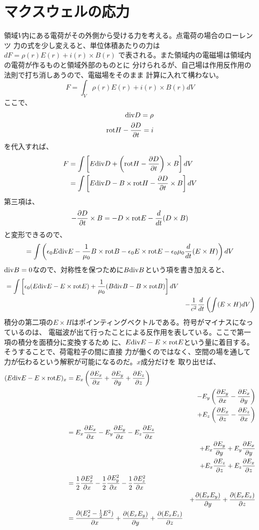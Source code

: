    \section{マクスウェルの応力}
        領域$V$内にある電荷がその外側から受ける力を考える。点電荷の場合のローレンツ
        力の式を少し変えると、単位体積あたりの力は$dF = \rho(r)E(r)+i(r)\times B(r)$
        で表される。また領域内の電磁場は領域内の電荷が作るものと領域外部のものとに
        分けられるが、自己場は作用反作用の法則で打ち消しあうので、電磁場をそのまま
        計算に入れて構わない。
            \[F = \int_V \rho(r)E(r) + i(r)\times B(r)dV\]
        ここで、
        \begin{align*}
            \dive D = \rho\\
            \rot H - \pd[D]{t} = i
        \end{align*}
        を代入すれば、
        \begin{align*}
            F &= \int \llr{E\dive D + \lr{\rot H - \pd[D]{t}}\times B}dV\\
            &= \int \llr{E\dive D - B\times\rot H - \pd[D]{t}\times B}dV
        \end{align*}
        第三項は、
            \[-\pd[D]{t}\times B = -D\times\rot E - \de{t}(D\times B)\]
        と変形できるので、
            \[= \int\lr{\epsilon_0E\dive E - \rec{\mu_0}B\times\rot B
            - \epsilon_0E\times\rot E - \epsilon_0\mu_0\de{t}(E\times H)}dV\]
        $\dive B = 0$なので、対称性を保つために$B\dive B$という項を書き加えると、
        \begin{align*}
            &= \int \llr{\epsilon_0(E\dive E-E\times\rot E)
            + \rec{\mu_0}(B\dive B - B\times\rot B)}dV\\
            & &- \rec{c^2}\de{t}\lr{\int (E\times H)dV}
        \end{align*}
        積分の第二項の$E\times H$はポインティングベクトルである。符号がマイナスになっているのは、
        電磁波が出て行ったことによる反作用を表している。ここで第一項の積分を面積分に変換するため
        に、$E\dive E-E\times\rot E$という量に着目する。そうすることで、荷電粒子の間に直接
        力が働くのではなく、空間の場を通して力が伝わるという解釈が可能になるのだ。$x$成分だけを
        取り出せば、
        \begin{align*}
            (E\dive E - E\times\rot E)_x
            &= E_x\lr{\pd[E_x]{x} + \pd[E_y]{y} + \pd[E_z]{z}}\\
               & &- E_y\lr{\pd[E_y]{x} - \pd[E_x]{y}}\\
               & &\ + E_z\lr{\pd[E_x]{z}-\pd[E_z]{x}}\\
            &= E_x\pd[E_x]{x} - E_y\pd[E_y]{x} - E_z\pd[E_z]{x}\\
               & &+ E_x\pd[E_y]{y} + E_y\pd[E_x]{y}\\
               & &\ + E_x\pd[E_z]{z}+E_z\pd[E_x]{z}\\
            &= \rec{2}\pd[E_x^2]{x} - \rec{2}\pd[E_y^2]{x} - \rec{2}\pd[E_z^2]{x}\\
               & &+ \pd[(E_xE_y)]{y} + \pd[(E_xE_z)]{z}\\
            &= \pd[(E_x^2 - \rec{2}E^2)]{x} + \pd[(E_xE_y)]{y} + \pd[(E_xE_z)]{z}
        \end{align*}
